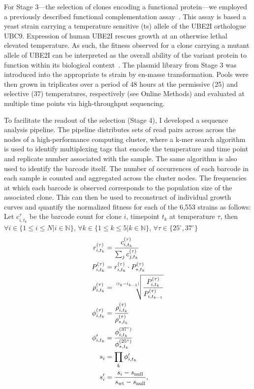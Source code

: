 For Stage 3---the selection of clones encoding a functional protein---we employed a previously described  functional complementation assay~\cite{lee_complementation_1987,osborn_rescuing_2007}. This assay is based a yeast strain carrying a temperature sensitive (ts) allele of the UBE2I orthologue UBC9. Expression of human UBE2I rescues growth at an otherwise lethal elevated temperature. As such, the fitness observed for a clone carrying a mutant allele of UBE2I can be interpreted as the overall ability of the variant protein to function within its biological context~\cite{sun_extended_2016}. 
The plasmid library from Stage 3 was introduced into the appropriate ts strain by en-masse transformation. Pools were then grown in triplicates over a period of 48 hours at the permissive (25\celsius ) and selective (37\celsius ) temperatures, respectively (see Online Methods) and evaluated at multiple time points via high-throughput sequencing.

To facilitate the readout of the selection (Stage 4), I developed a sequence analysis pipeline. The pipeline distributes sets of read pairs across across the nodes of a high-performance computing cluster, where a k-mer search algorithm is used to identify multiplexing tags that encode the temperature and time point and replicate number associated with the sample. The same algorithm is also used to identify the barcode itself. The number of occurrences of each barcode in each sample is counted and aggregated across the cluster nodes. The frequencies at which each barcode is observed corresponds to the population size of the associated clone. This can then be used to reconstruct of individual growth curves and quantify the normalized fitness for each of the 6,553 strains as follows: Let $c_{i,t_k}^\tau$ be the barcode count for clone $i$, timepoint $t_k$ at temperature $\tau$, then $ \forall i \in \{1 \le i \le N | i \in \mathbb{N} \}$, 
$\forall k \in \{1 \le k \le 5 | k \in \mathbb{N} \}$, 
$\forall \tau \in \{25^{\circ},37^{\circ} \}$
\begin{align*}
r_{i,t_k}^{(\tau)} &= \frac{ c_{i,t_k}^{(\tau)} }{ \sum_j c_{j,t_k}^{(\tau)} }\\
P_{i,t_k}^{(\tau)} &= r_{i,t_k}^{(\tau)} \cdot P_{*,t_k}^{(\tau)} \\
\rho_{i,t_k}^{(\tau)} &= \sqrt[\uproot{5}(t_k - t_{k-1})]{\frac{P_{i,t_k}^{(\tau)}}{P_{i,t_{k-1}}^{(\tau)}}} \\
\phi_{i,t_k}^{(\tau)} &= \frac{\rho_{i,t_k}^{(\tau)}}{\rho_{*,t_k}^{(\tau)}}\\
\phi_{i,t_k}^\prime &= \frac{\phi_{i,t_k}^{(37^{\circ})}}{\phi_{*,t_k}^{(25^{\circ})}}\\
s_i &= \prod_k \phi_{i,t_k}^\prime \\
s'_i &= \frac{s_i - s_\text{null}}{s_\text{wt} - s_\text{null}},
\end{align*}

